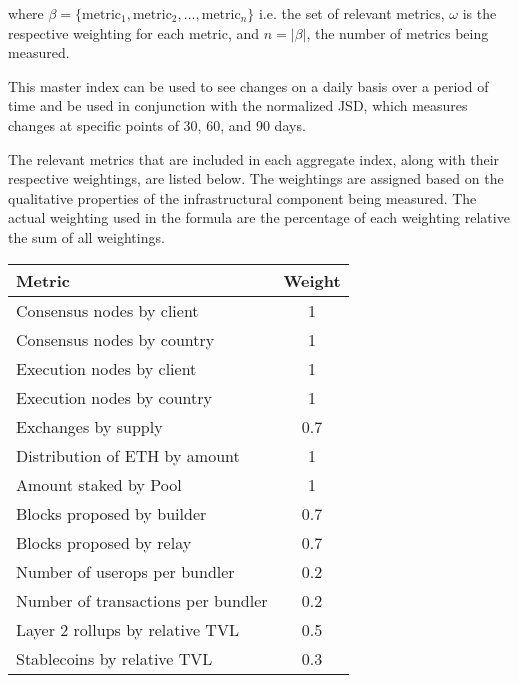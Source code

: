 \documentclass[conference]{IEEEtran}
\begin{document}
\vspace{8pt}

where \(\beta=\{\text{metric}_1, \text{metric}_2, ..., \text{metric}_n\}\) i.e. the set of relevant metrics, $\omega$ is the respective weighting for each metric, and $n=\left| \beta \right|$, the number of metrics being measured.

This master index can be used to see changes on a daily basis over a period of time and be used in conjunction with the normalized JSD, which measures changes at specific points of 30, 60, and 90 days.

The relevant metrics that are included in each aggregate index, along with their respective weightings, are listed below. The weightings are assigned based on the qualitative properties of the infrastructural component being measured. The actual weighting used in the formula are the percentage of each weighting relative the sum of all weightings.

\vspace{6pt}
\begin{table}[h]
\normalsize
\begin{center}
\begin{tabular}{|l|c|}
\hline
\textbf{Metric} & \textbf{Weight} \\ \hline
Consensus nodes by client & 1 \\ \hline
Consensus nodes by country & 1 \\ \hline
Execution nodes by client & 1 \\ \hline
Execution nodes by country & 1 \\ \hline
Exchanges by supply & 0.7 \\ \hline
Distribution of ETH by amount & 1 \\ \hline
Amount staked by Pool & 1 \\ \hline
Blocks proposed by builder & 0.7 \\ \hline
Blocks proposed by relay & 0.7 \\ \hline
Number of userops per bundler & 0.2 \\ \hline
Number of transactions per bundler & 0.2 \\ \hline
Layer 2 rollups by relative TVL & 0.5 \\ \hline
Stablecoins by relative TVL & 0.3 \\ \hline
\end{tabular}
\end{center}
\end{table}
\end{document}
